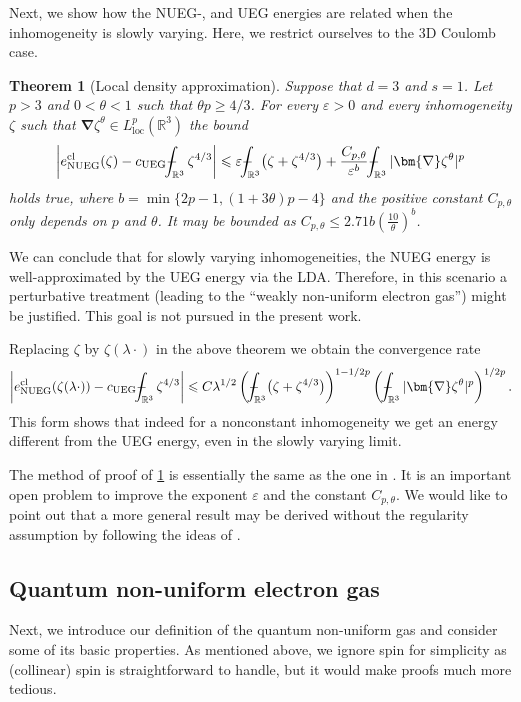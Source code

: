 \documentclass[final,onefignum,onetabnum,reqno]{amsart}
\newtheorem{theorem}{Theorem}[section]
\theoremstyle{remark}
\renewcommand{\le}{\leqslant}
\renewcommand{\ge}{\geqslant}
\renewcommand{\epsilon}{\varepsilon}
\newcommand{\RR}{\mathbb{R}}
\newcommand{\cl}{\mathrm{cl}} %
\newcommand{\UEG}{\mathrm{UEG}} %
\newcommand{\NUEG}{\mathrm{NUEG}} %
\newcommand{\grad}{\bm{\nabla}} %
\newcommand{\Lloc}{L_{\mathrm{loc}}} %
\def\Xint#1{\mathchoice
{\XXint\displaystyle\textstyle{#1}}%
{\XXint\textstyle\scriptstyle{#1}}%
{\XXint\scriptstyle\scriptscriptstyle{#1}}%
{\XXint\scriptscriptstyle\scriptscriptstyle{#1}}%
\!\int}
\def\XXint#1#2#3{{\setbox0=\hbox{$#1{#2#3}{\int}$ }
\vcenter{\hbox{$#2#3$ }}\kern-.6\wd0}}
\def\dashint{\Xint-}
\begin{document}
Next, we show how the NUEG-, and UEG energies are related when the inhomogeneity is slowly varying. 
Here, we restrict ourselves to the 3D Coulomb case.

\begin{theorem}[Local density approximation]\label{cllda}
Suppose that $d=3$ and $s=1$. Let $p>3$ and $0<\theta<1$ such that $\theta p\ge 4/3$. For every $\epsilon>0$ and every inhomogeneity $\zeta$ such that $\grad\zeta^\theta\in\Lloc^p(\RR^3)$ the bound
\begin{equation}\label{clldaest}
\left| e_\NUEG^\cl(\zeta) - c_\UEG \dashint_{\RR^3} \zeta^{4/3} \right| \le \epsilon \dashint_{\RR^3} \bigl(\zeta + \zeta^{4/3}\bigr) 
+ \frac{C_{p,\theta}}{\epsilon^b} \dashint_{\RR^3} |\grad\zeta^\theta|^p 
\end{equation}
holds true, where $b=\min\{2p-1,(1+3\theta)p-4\}$ and the positive constant $C_{p,\theta}$ only depends on $p$ and $\theta$. It may be bounded as $C_{p,\theta}\le 2.71 b \left(\frac{10}{\theta}\right)^b$.
\end{theorem}

We can conclude that for slowly varying inhomogeneities, the NUEG energy is well-approximated by the UEG energy via the LDA. Therefore, in this scenario a perturbative treatment (leading to the ``weakly non-uniform electron gas'') might be justified. This goal is not pursued in the present work.

Replacing $\zeta$ by $\zeta(\lambda\cdot)$ in the above theorem we obtain the convergence rate
$$
\left|e_\NUEG^\cl(\zeta(\lambda\cdot))-c_\UEG \dashint_{\RR^3} \zeta^{4/3}\right|\le C\lambda^{1/2} \left(\dashint_{\RR^3} \bigl(\zeta + \zeta^{4/3}\bigr)\right)^{1-1/2p}
\left(\dashint_{\RR^3} |\grad\zeta^\theta|^p \right)^{1/2p}.
$$
This form shows that indeed for a nonconstant inhomogeneity we get an energy different from the UEG energy, even in the slowly varying limit. 

The method of proof of \cref{cllda} is essentially the same as the one in \cite[Appendix A]{lewin2020local}. It is an important open problem to improve the exponent $\epsilon$ and the constant $C_{p,\theta}$.
We would like to point out that a more general result may be derived without the regularity assumption by following the ideas of \cite{jex2025classical}. 

\subsection{Quantum non-uniform electron gas}\label{qnuegsec}
Next, we introduce our definition of the quantum non-uniform gas and consider some of its basic properties. As mentioned above, we ignore spin for simplicity as (collinear) spin is straightforward to handle, but it would make proofs much more tedious. 
\end{document}

